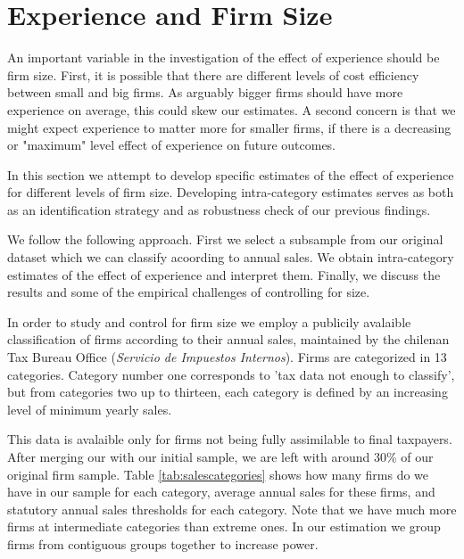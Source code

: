      \section{Experience and Firm Size}
     An important variable in the investigation of the effect of experience should be firm size. First, it is possible that there are different levels of cost efficiency between small and big firms. As arguably bigger firms should have more experience on average, this could skew our estimates. A second concern is that we might expect experience to matter more for smaller firms, if there is a decreasing or "maximum" level effect of experience on future outcomes.

     In this section we attempt to develop specific estimates of the effect of experience for different levels of firm size. Developing intra-category estimates serves as both as an identification strategy and as  robustness check of our previous findings.

      We follow the following approach. First we select a subsample from our original dataset which we can classify acoording to annual sales.  We obtain intra-category estimates of the effect of experience and interpret them. Finally, we discuss the results and some of the empirical challenges of controlling for size.

     In order to study and control for firm size we employ a publicily avalaible classification of firms according to their annual sales, maintained by the chilenan Tax Bureau Office (\textit{Servicio de Impuestos Internos}). Firms are categorized in 13 categories. Category number one  corresponds to 'tax data not enough to classify', but from categories two up to thirteen, each category is defined by an increasing level of minimum yearly sales.

     This data is avalaible only for firms not being fully assimilable to final taxpayers. After merging our with our initial sample, we are left with around 30\% of our original firm sample. Table \ref{tab:salescategories} shows how many firms do we have in our sample for each category, average annual sales for these firms, and statutory annual sales thresholds for each category. Note that we have much more firms at intermediate categories than extreme ones. In our estimation we group firms from contiguous groups together to increase power.

